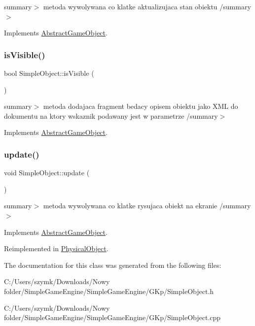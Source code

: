 summary$>$ metoda wywolywana co klatke aktualizujaca stan obiektu /summary$>$ 

Implements \hyperlink{class_abstract_game_object_ac934d513fd18a520d8b68dd5a7ac7399}{Abstract\+Game\+Object}.

\mbox{\label{class_simple_object_a2475d0a90f1cb7bc5765a632efe9ddd4}} 
\subsubsection{\texorpdfstring{is\+Visible()}{isVisible()}}
{\footnotesize\ttfamily bool Simple\+Object\+::is\+Visible (\begin{DoxyParamCaption}{ }\end{DoxyParamCaption})\hspace{0.3cm}{\ttfamily [virtual]}}

summary$>$ metoda dodajaca fragment bedacy opisem obiektu jako X\+ML do dokumentu na ktory wskaznik podawany jest w parametrze /summary$>$ 

Implements \hyperlink{class_abstract_game_object_afddc4040f2d1a7effc0e0baa9950b2e2}{Abstract\+Game\+Object}.

\mbox{\label{class_simple_object_a38a3ceafd11a673fd68dd87ed6ebd35b}} 
\subsubsection{\texorpdfstring{update()}{update()}}
{\footnotesize\ttfamily void Simple\+Object\+::update (\begin{DoxyParamCaption}{ }\end{DoxyParamCaption})\hspace{0.3cm}{\ttfamily [virtual]}}

summary$>$ metoda wywolywana co klatke rysujaca obiekt na ekranie /summary$>$ 

Implements \hyperlink{class_abstract_game_object_a162f800603ac5671ff24ad8042c062b5}{Abstract\+Game\+Object}.



Reimplemented in \hyperlink{class_physical_object_a3005ac0afce838049101db17525f6004}{Physical\+Object}.



The documentation for this class was generated from the following files\+:\begin{DoxyCompactItemize}
\item 
C\+:/\+Users/szymk/\+Downloads/\+Nowy folder/\+Simple\+Game\+Engine/\+Simple\+Game\+Engine/\+G\+Kp/Simple\+Object.\+h\item 
C\+:/\+Users/szymk/\+Downloads/\+Nowy folder/\+Simple\+Game\+Engine/\+Simple\+Game\+Engine/\+G\+Kp/Simple\+Object.\+cpp\end{DoxyCompactItemize}

